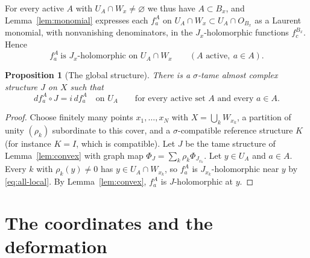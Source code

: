 \documentclass[12pt]{article}
\newtheorem{proposition}[theorem]{Proposition}
\theoremstyle{remark}
\begin{document}
For every active $A$ with $U_A\cap W_x\ne\varnothing$ we thus have
$A\subset B_x$, and Lemma~\ref{lem:monomial} expresses each $f^A_a$ on
$U_A\cap W_x\subset U_A\cap O_{B_x}$ as a Laurent monomial, with
nonvanishing denominators, in the $J_x$-holomorphic functions
$f^{B_x}_c$. Hence
\begin{equation}\label{eq:all-local}
 f^A_a\ \text{is $J_x$-holomorphic on }U_A\cap W_x
 \qquad(A\text{ active},\ a\in A).
\end{equation}

\begin{proposition}[The global structure]\label{prop:global}
There is a $\sigma$-tame almost complex structure $J$ on $X$ such that
\begin{equation}\label{eq:finalhol}
 df^A_a\circ J=i\,df^A_a\quad\text{on }U_A
 \qquad\text{for every active set $A$ and every }a\in A.
\end{equation}
\end{proposition}

\begin{proof}
Choose finitely many points $x_1,\dots,x_N$ with
$X=\bigcup_kW_{x_k}$, a partition of unity $(\rho_k)$ subordinate to
this cover, and a $\sigma$-compatible reference structure $K$ (for
instance $K=I$, which is compatible). Let $J$ be the tame structure of
Lemma~\ref{lem:convex} with graph map
$\Phi_J=\sum_k\rho_k\Phi_{J_{x_k}}$. Let $y\in U_A$ and $a\in A$. Every $k$
with $\rho_k(y)\ne0$ has $y\in U_A\cap W_{x_k}$, so $f^A_a$ is
$J_{x_k}$-holomorphic near $y$ by \eqref{eq:all-local}. By
Lemma~\ref{lem:convex}, $f^A_a$ is $J$-holomorphic at $y$.
\end{proof}

\section{The coordinates and the deformation}\label{sec:end}
\end{document}
